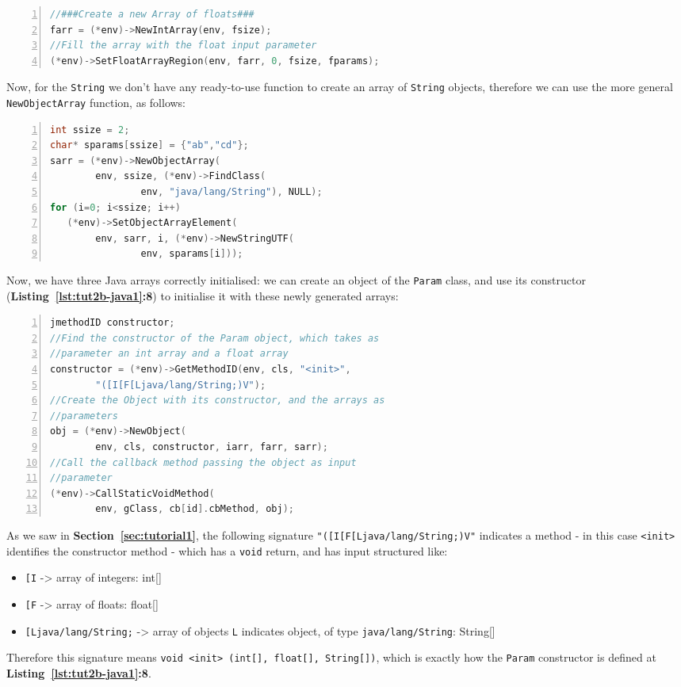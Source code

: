 \documentclass[a4paper,10pt]{article}
\newcommand{\keyword}[1]{\texttt{#1}}
\newcommand{\refl}[1]{\textbf{Listing~\ref{#1}}}
\newcommand{\refs}[1]{\textbf{Section~\ref{#1}}}
\begin{document}
\begin{multicols}{2}
\begin{lstlisting}[language=C,
				   columns=fullflexible,
				   showstringspaces=false,
				   xleftmargin=15pt,
				   frame = l,
				   numbers=left,
				   commentstyle=\color{gray}\upshape]
//###Create a new Array of floats###
farr = (*env)->NewIntArray(env, fsize);
//Fill the array with the float input parameter
(*env)->SetFloatArrayRegion(env, farr, 0, fsize, fparams);
\end{lstlisting}
Now, for the \keyword{String} we don't have any ready-to-use function to create an array of \keyword{String} objects, therefore we can use the more general \keyword{NewObjectArray} function, as follows:
\begin{lstlisting}[language=C,
				   columns=fullflexible,
				   showstringspaces=false,
				   xleftmargin=15pt,
				   frame = l,
				   numbers=left,
				   commentstyle=\color{gray}\upshape]
int ssize = 2;
char* sparams[ssize] = {"ab","cd"};
sarr = (*env)->NewObjectArray(
		env, ssize, (*env)->FindClass(
				env, "java/lang/String"), NULL);
for (i=0; i<ssize; i++)
   (*env)->SetObjectArrayElement(
   		env, sarr, i, (*env)->NewStringUTF(
   				env, sparams[i]));
\end{lstlisting}
Now, we have three Java arrays correctly initialised: we can create an object of the \keyword{Param} class, and use its constructor (\refl{lst:tut2b-java1}\textbf{:8}) to initialise it with these newly generated arrays:
\begin{lstlisting}[language=C,
				   columns=fullflexible,
				   showstringspaces=false,
				   xleftmargin=15pt,
				   frame = l,
				   numbers=left,
				   commentstyle=\color{gray}\upshape]
jmethodID constructor;
//Find the constructor of the Param object, which takes as
//parameter an int array and a float array
constructor = (*env)->GetMethodID(env, cls, "<init>",
		"([I[F[Ljava/lang/String;)V");
//Create the Object with its constructor, and the arrays as
//parameters
obj = (*env)->NewObject(
		env, cls, constructor, iarr, farr, sarr);
//Call the callback method passing the object as input
//parameter
(*env)->CallStaticVoidMethod(
		env, gClass, cb[id].cbMethod, obj);
\end{lstlisting}
As we saw in \refs{sec:tutorial1}, the following signature \keyword{"([I[F[Ljava/lang/String;)V"} indicates a method - in this case \keyword{<init>} identifies the constructor method - which has a \keyword{void} return, and has input structured like:
\begin{itemize}
\item \keyword{[I} -> array of integers: int[]
\item \keyword{[F} -> array of floats: float[]
\item \keyword{[Ljava/lang/String;} -> array of objects \keyword{L} indicates object, of type \keyword{java/lang/String}: String[]
\end{itemize}
Therefore this signature means \keyword{void <init> (int[], float[], String[])}, which is exactly how the \keyword{Param} constructor is defined at \refl{lst:tut2b-java1}\textbf{:8}.


\end{multicols}
\end{document}
